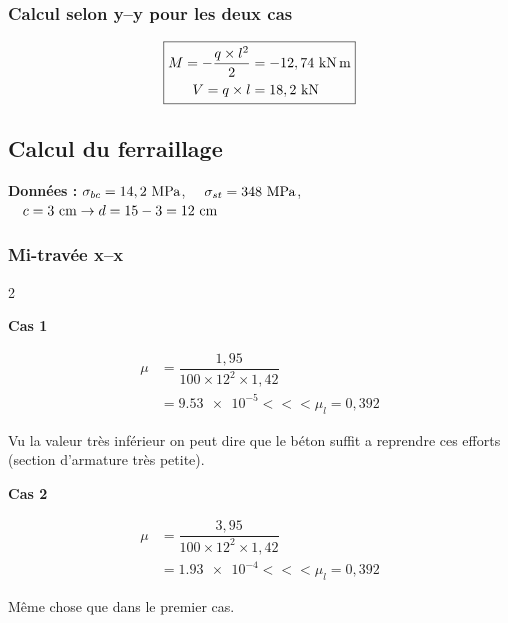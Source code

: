 	
	
	
	\subsubsection{Calcul selon y--y pour les deux cas}
	
	\begin{figure}[H]
		\centering
	\end{figure}
	
	
	\[ \fbox{$\begin{aligned}
			M = -\dfrac{q \times l^{2}}{2} &= -12,74\knxm \\
			V = q \times l &= 18,2\kn 
		\end{aligned}$} \]
	
	
	
	
	\subsection{Calcul du ferraillage}
	
	\textbf{Données :} $\sgma{bc} = 14,2\mpa$, $\quad\sgma{st} = 348\mpa$, $\quad c = 3\cml \rightarrow d = 15 - 3 = 12\cml$
	
	
	\subsubsection{Mi-travée x--x}
	
	\begin{multicols}{2}
		
		\textbf{Cas 1}
		
		\[ \begin{aligned}
			\mu &= \dfrac{1,95}{100 \times 12^{2} \times 1,42} \\
			&= \num{9,53e-5} <<< \mu_{l} = 0,392
		\end{aligned} \]
		
		Vu la valeur très inférieur on peut dire que le béton suffit a reprendre ces efforts (section d'armature très petite).
		
		\columnbreak
		
		\textbf{Cas 2}
		
		\[ \begin{aligned}
			\mu &= \dfrac{3,95}{100 \times 12^{2} \times 1,42} \\
			&= \num{1,93e-4} <<< \mu_{l} = 0,392
		\end{aligned} \]
		
		\hspace{0.5cm} Même chose que dans le premier cas.
		
	\end{multicols}
	
